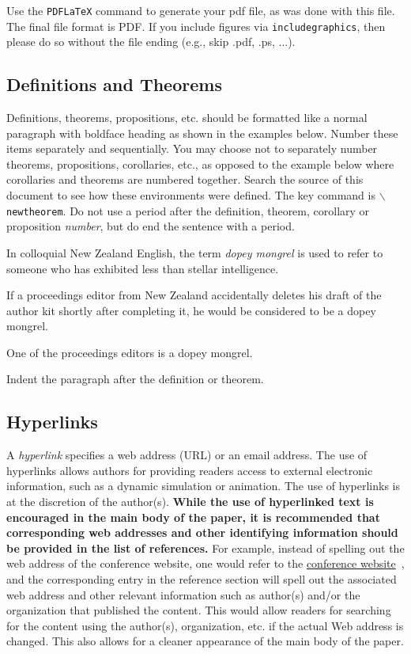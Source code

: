 \documentclass{article}
\begin{document}
Use the {\tt PDFLaTeX} command to generate your pdf file, as was done with this file. 
The final file format is PDF.
If you include figures via {\tt includegraphics}, then please do so without the file ending (e.g., skip .pdf, .ps, ...).

\subsection{Definitions and Theorems}
Definitions, theorems, propositions, etc. should be formatted like a normal paragraph with boldface heading as shown in the examples below. Number
these items separately and sequentially. You may choose not to separately number theorems, propositions, corollaries, etc., as opposed to the example below where corollaries and theorems are numbered together. Search the source of this document to see how these environments were defined. The key
command is {\tt $\backslash$newtheorem}. Do not use a period after the definition, theorem, corollary or proposition \textit{number}, but do end the sentence with a period.

\begin{definition}
In colloquial New Zealand English, the term {\em dopey mongrel} is used to refer to someone who has exhibited less than stellar intelligence.
\end{definition}

\begin{theorem}
If a proceedings editor from New Zealand accidentally deletes his draft of the author kit shortly after completing it, he would be considered to be a dopey mongrel.
\end{theorem}

\begin{corollary}
One of the proceedings editors is a dopey mongrel.
\end{corollary}

Indent the paragraph after the definition or theorem.

\subsection{Hyperlinks}
\label{sec: hyper}
A {\em hyperlink} specifies a web address (URL) or an email address.
The use of hyperlinks allows authors for providing readers access to external electronic information, such as a dynamic simulation or animation.
The use of hyperlinks is at the discretion of the author(s).
{\bf While the use of hyperlinked text is encouraged in the main body of the paper, it is recommended that corresponding web addresses and other identifying information should be provided in the list of references.}
For example, instead of spelling out the web address of the conference website, one would refer to the \href{http://www.wintersim.org}{conference website}~\cite{WSC}, and the corresponding entry in the reference section will spell out the associated web address and other relevant information such as author(s) and/or the organization that published the content.
This would allow readers for searching for the content using the author(s), organization, etc. if the actual Web address is changed. This also allows for a cleaner appearance of the main body of the paper.
\end{document}
